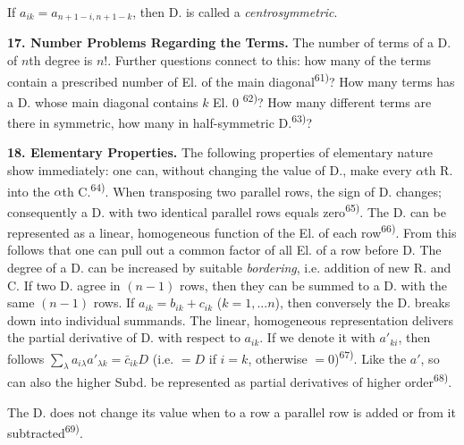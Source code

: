 \thispagestyle{fancy}

\vspace{0.5cm}

If $a_{ik}=a_{n+1-i,n+1-k}$, then D. is called a \textit{centrosymmetric}.

\vspace{0.2cm}

\textbf{17. Number Problems Regarding the Terms.} The number of terms of a D. of $n$th degree is $n!$. Further questions connect to this: how many of the terms contain a prescribed number of El. of the main diagonal\textsuperscript{61)}? How many terms has a D. whose main diagonal contains $k$ El. 0 \textsuperscript{62)}? How many different terms are there in symmetric, how many in half-symmetric D.\textsuperscript{63)}?

\vspace{0.2cm}

\textbf{18. Elementary Properties.} The following properties of elementary nature show immediately: one can, without changing the value of D., make every $\alpha$th R. into the $\alpha$th C.\textsuperscript{64)}. When transposing two parallel rows, the sign of D. changes; consequently a D. with two identical parallel rows equals zero\textsuperscript{65)}. The D. can be represented as a linear, homogeneous function of the El. of each row\textsuperscript{66)}. From this follows that one can pull out a common factor of all El. of a row before D. The degree of a D. can be increased by suitable \textit{bordering}, i.e. addition of new R. and C. If two D. agree in $(n-1)$ rows, then they can be summed to a D. with the same $(n-1)$ rows. If $a_{ik}=b_{ik}+c_{ik}$ ($k=1,...n$), then conversely the D. breaks down into individual summands. The linear, homogeneous representation delivers the partial derivative of D. with respect to $a_{ik}$. If we denote it with $a'_{ki}$, then follows $\sum_{\lambda} a_{i\lambda}a'_{\lambda k} = \bar{c}_{ik}D$ (i.e. $=D$ if $i=k$, otherwise $=0$)\textsuperscript{67)}. Like the $a'$, so can also the higher Subd. be represented as partial derivatives of higher order\textsuperscript{68)}.

The D. does not change its value when to a row a parallel row is added or from it subtracted\textsuperscript{69)}.

